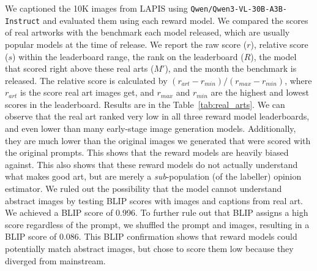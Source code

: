 We captioned the 10K images from LAPIS using \texttt{Qwen/Qwen3-VL-30B-A3B-Instruct} and evaluated them using each reward model. We compared the scores of real artworks with the benchmark each model released, which are usually popular models at the time of release. We report the raw score ($r$), relative score ($s$) within the leaderboard range, the rank on the leaderboard ($R$), the model that scored right above these real arts ($M'$), and the month the benchmark is released. The relative score is calculated by $(r_{art}-r_{min})/(r_{max} - r_{min})$, where $r_{art}$ is the score real art images get, and $r_{max}$ and $r_{min}$ are the highest and lowest scores in the leaderboard. Results are in the Table~\ref{tab:real_arts}. We can observe that the real art ranked very low in all three reward model leaderboards, and even lower than many early-stage image generation models. Additionally, they are much lower than the original images we generated that were scored with the original prompts. This shows that the reward models are heavily biased against. 
This also shows that these reward models do not actually understand what makes good art, but are merely a \textit{sub}-population (of the labeller) opinion estimator. We ruled out the possibility that the model cannot understand abstract images by testing BLIP scores with images and captions from real art. We achieved a BLIP score of 0.996. To further rule out that BLIP assigns a high score regardless of the prompt, we shuffled the prompt and images, resulting in a BLIP score of 0.086. This BLIP confirmation shows that reward models could potentially match abstract images, but chose to score them low because they diverged from mainstream. 


